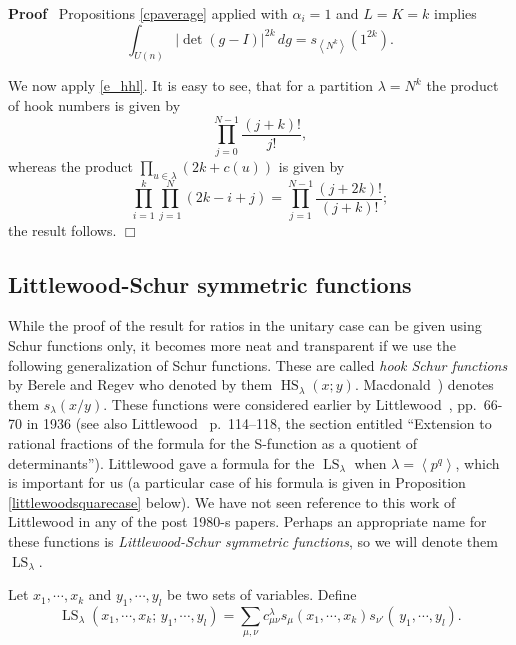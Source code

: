 \documentclass[11pt]{amsart}
\newcommand{\tmem}[1]{{\em #1\/}}
\newcommand{\tmop}[1]{\ensuremath{\operatorname{#1}}}
\renewenvironment{proof}{
\noindent\textbf{Proof}\ }{\hspace*{\fill}
\begin{math}\Box\end{math}\medskip}
\begin{document}
\begin{proof}
Propositions \ref{cpaverage} applied with $\alpha_i=1$ and $L=K=k$
implies
$$\int_{U ( n )} | \det ( g - I ) |^{2 k} \, d g =s_{\left\langle N^k
\right\rangle}(1^{2k}).$$

We now apply \eqref{e_hhl}.  It is easy to see, that for a
partition $\lambda=N^k$ the product of hook numbers is given by
\begin{equation} \label{hook123}
\prod_{j=0}^{N-1}\frac{(j+k)!}{j!}, \end{equation} whereas the
product $\prod_{u \in \lambda}(2k+c(u))$ is given by
\[\prod_{i=1}^{k}\prod_{j=1}^{N}(2k-i+j)
=\prod_{j=1}^{N-1}\frac{(j+2k)!}{(j+k)!};\] the result follows.
\end{proof}

\subsection{Littlewood-Schur symmetric functions}
While the proof of the result for ratios in the unitary case can
be given using Schur functions only, it becomes more neat and
transparent if we use the following generalization of Schur
functions. These are called {\tmem{hook Schur functions}} by
Berele and Regev {\cite{BR87}} who denoted by them
$\tmop{HS}_{\lambda} (x; y)$. Macdonald~\cite[p.27, ex. 5; p.45,
ex. 3]{Mac})  denotes them $s_{\lambda} ( x / y )$.   These
functions were considered earlier by Littlewood~{\cite{Li1}},
pp.~66-70 in 1936 (see also Littlewood~{\cite{Li}} p.~114--118,
the section entitled ``Extension to rational fractions of the
formula for the S-function as a quotient of determinants'').
Littlewood  gave a formula for the $\tmop{LS}_{\lambda}$ when
$\lambda = \left\langle p^q \right\rangle$, which is important for
us (a particular case of his formula is given in Proposition
\ref{littlewoodsquarecase} below). We have not seen reference to
this work of Littlewood in any of the post 1980-s papers. Perhaps
an appropriate name for these functions is {\tmem{Littlewood-Schur
symmetric functions}}, so we will denote
them~$\tmop{LS}_{\lambda}$.


Let $x_1, \cdots, x_k$ and $y_1, \cdots, y_l$ be two sets of
variables. Define
\[ \tmop{LS}_{\lambda} ( x_1, \cdots, x_k ; \, y_1, \cdots, y_l ) = \sum_{\mu,
  \nu} c^{\lambda}_{\mu \nu} s_{\mu} ( x_1, \cdots, x_k ) s_{\nu'} ( \, y_1,
  \cdots, y_l ) . \]
\end{document}
